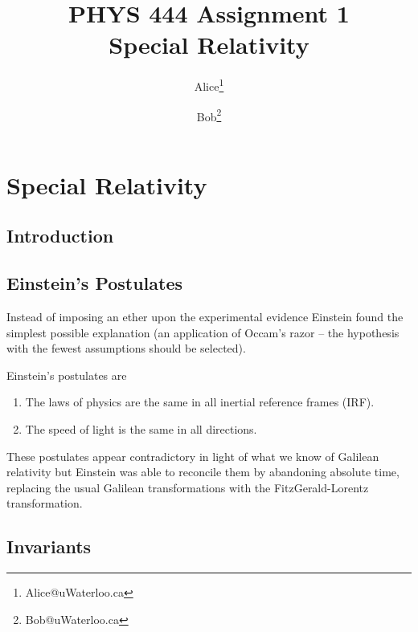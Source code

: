 \documentclass[12pt,oneside]{book}
\title{PHYS 444
\hfill
Assignment 1
\\
Special Relativity}
\author{
	Alice\footnote{Alice@uWaterloo.ca}
\and %
	Bob\footnote{Bob@uWaterloo.ca}
}
\begin{document}
\frontmatter
\maketitle
\tableofcontents
\mainmatter
\setcounter{chapter}{0}
\chapter{Special Relativity}	\label{ch:Special Relativity}
\section{Introduction}

\section{Einstein's Postulates}

Instead of imposing an ether upon the experimental evidence Einstein found the simplest possible explanation (an application of Occam's razor -- the hypothesis with the fewest assumptions should be selected).

Einstein's postulates are 
\begin{enumerate}
\item
The laws of physics are the same in all inertial reference frames (IRF).
\item
The speed of light is the same in all directions.
\end{enumerate}

These postulates appear contradictory in light of what we know of Galilean relativity but Einstein was able to reconcile them by abandoning absolute time, replacing the usual Galilean transformations with the FitzGerald-Lorentz transformation.
\section{Invariants}
\end{document}
